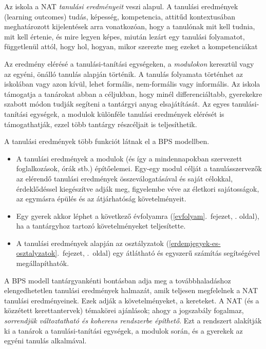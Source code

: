 Az iskola a NAT \emph{tanulási eredményeit} veszi alapul. A tanulási
eredmények (learning outcomes) tudás, képesség, kompetencia, attitűd
kontextusában meghatározott kijelentések arra vonatkozóan, hogy a
tanulónak mit kell tudnia, mit kell értenie, és mire legyen képes,
miután lezárt egy tanulási folyamatot, függetlenül attól, hogy hol,
hogyan, mikor szerezte meg ezeket a kompetenciákat
{\autocite{Cedefop2008}}

Az eredmény elérésé a tanulási-tanítási egységeken, a \emph{modulokon}
keresztül vagy az egyéni, önálló tanulás alapján történik. A tanulás
folyamata történhet az iskolában vagy azon kívül, lehet formális,
nem-formális vagy informális. Az iskola támogatja a tanárokat abban a
céljukban, hogy minél differenciáltabb, gyerekekre szabott módon
tudják segíteni a tantárgyi anyag elsajátítását. Az egyes
tanulási-tanítási egységek, a modulok különféle tanulási eredmények
elérését is támogathatják, ezzel több tantárgy részcéljait is
teljesíthetik.

A tanulási eredmények több funkciót látnak el a BPS modellben.

\begin{itemize}
\item
  A tanulási eredmények a modulok (és így a mindennapokban szervezett
  foglalkozások, órák stb.) építőelemei. Egy-egy modul célját a
  tanulásszervezők az elérendő tanulási eredmények összeválogatásával és
  saját célokkal, érdeklődéssel kiegészítve adják meg, figyelembe véve
  az életkori sajátosságok, az egymásra épülés és az átjárhatóság
  követelményeit.
\item
  Egy gyerek akkor
  léphet a következő évfolyamra
  (\ref{evfolyam}.~fejezet, \pageref{evfolyam}. oldal),
  ha a tantárgyhoz tartozó követelményeket teljesítette.
\item
  A tanulási eredmények alapján
  az osztályzatok (\ref{erdemjegyek-es-osztalyzatok}.~fejezet, \pageref{erdemjegyek-es-osztalyzatok}.~oldal)
  egy átlátható és egyszerű számítás segítségével megállapíthatók.
\end{itemize}

A BPS modell tantárgyankénti bontásban adja meg a továbbhaladáshoz
elengedhetetlen tanulási eredmények halmazát, amik teljesen megfelelnek
a NAT tanulási eredményeinek. Ezek adják a követelményeket, a kereteket.
A NAT (és a közzétett kerettantervek) témakörei ajánlások; ahogy a
jogszabály fogalmaz, \emph{sorrendjük változtatható és koherens
rendszerbe építhető}. Ezt a rendszert alakítják ki a tanárok a
tanulási-tanítási egységek, a modulok során, és a gyerekek az egyéni
tanulás alkalmával.


